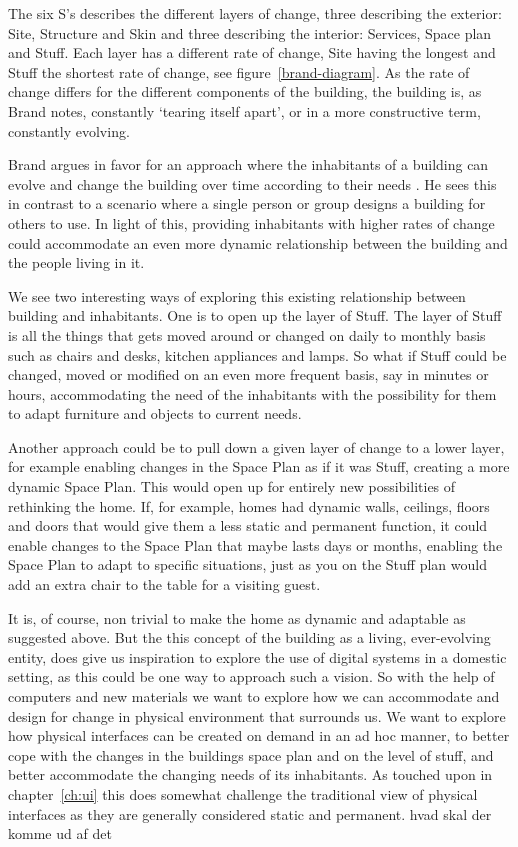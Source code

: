 The six S's describes the different layers of change, three describing the exterior: Site, Structure and Skin and three describing the interior: Services, Space plan and Stuff.
Each layer has a different rate of change, Site having the longest and Stuff the shortest rate of change, see figure~\ref{brand-diagram}.
As the rate of change differs for the different components of the building, the building is, as Brand notes, constantly `tearing itself apart', or in a more constructive term, constantly evolving.

Brand argues in favor for an approach where the inhabitants of a building can evolve and change the building over time according to their needs \citep{brandBBCvideo}.
He sees this in contrast to a scenario where a single person or group designs a building for others to use.
In light of this, providing inhabitants with higher rates of change could accommodate an even more dynamic relationship between the building and the people living in it.

We see two interesting ways of exploring this existing relationship between building and inhabitants.
One is to open up the layer of Stuff.
The layer of Stuff is all the things that gets moved around or changed on daily to monthly basis such as chairs and desks, kitchen appliances and lamps.
So what if Stuff could be changed, moved or modified on an even more frequent basis, say in minutes or hours, accommodating the need of the inhabitants with the possibility for them to adapt furniture and objects to current needs.

Another approach could be to pull down a given layer of change to a lower layer, for example enabling changes in the Space Plan as if it was Stuff, creating a more dynamic Space Plan.
This would open up for entirely new possibilities of rethinking the home. 
If, for example, homes had dynamic walls, ceilings, floors and doors that would give them a less static and permanent function, it could enable changes to the Space Plan that maybe lasts days or months, enabling the Space Plan to adapt to specific situations, just as you on the Stuff plan would add an extra chair to the table for a visiting guest. 

It is, of course, non trivial to make the home as dynamic and adaptable as suggested above.
But the this concept of the building as a living, ever-evolving entity, does give us inspiration to explore the use of digital systems in a domestic setting, as this could be one way to approach such a vision.
So with the help of computers and new materials we want to explore how we can accommodate and design for change in physical environment that surrounds us.
We want to explore how physical interfaces can be created on demand in an ad hoc manner, to better cope with the changes in the buildings space plan and on the level of stuff, and better accommodate the changing needs of its inhabitants.
As touched upon in chapter~\ref{ch:ui} this does somewhat challenge the traditional view of physical interfaces as they are generally considered static and permanent.
hvad skal der komme ud af det

